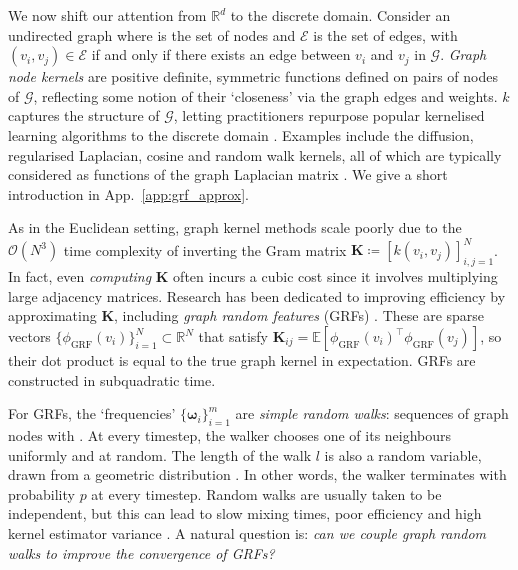 We now shift our attention from $\mathbb{R}^d$ to the discrete domain.
Consider an undirected graph  where  is the set of nodes and $\mathcal{E}$ is the set of edges, with $(v_i,v_j)\in \mathcal{E}$ if and only if there exists an edge between $v_i$ and $v_j$ in $\mathcal{G}$. 
\emph{Graph node kernels}  are positive definite, symmetric functions defined on pairs of nodes of $\mathcal{G}$, reflecting some notion of their `closeness' via the graph edges and weights. 
$k$ captures the structure of $\mathcal{G}$, letting practitioners repurpose popular kernelised learning algorithms to the discrete domain \citep{smola2003kernels,smola-kondor}. 
Examples include the diffusion, regularised Laplacian, cosine and random walk kernels, all of which are typically considered as functions of the graph Laplacian matrix \citep{kondor2002diffusion}.
We give a short introduction in App.~\ref{app:grf_approx}.



As in the Euclidean setting, graph kernel methods scale poorly due to the $\mathcal{O}(N^3)$ time complexity of inverting the Gram matrix $\mathbf{K}\coloneqq [k(v_i,v_j)]_{i,j=1}^N$. 
In fact, even \emph{computing} $\mathbf{K}$ often incurs a cubic cost since it involves multiplying large adjacency matrices. 
Research has been dedicated to improving efficiency by approximating $\mathbf{K}$, including \emph{graph random features} (GRFs) \citep{graph_features,reid2023universal}. 
These are sparse vectors $\{\phi_\textrm{GRF}(v_i)\}_{i=1}^N \subset \mathbb{R}^N$ that satisfy $\mathbf{K}_{ij} = \mathbb{E} \left [ \phi_\textrm{GRF}(v_i)^\top \phi_\textrm{GRF}(v_j) \right ]$, so their dot product is equal to the true graph kernel in expectation.
GRFs are constructed in subquadratic time. 

For GRFs, the `frequencies' $\{\boldsymbol{\omega}_i\}_{i=1}^m$ are \emph{simple random walks}: sequences of graph nodes  with . 
At every timestep, the walker chooses one of its neighbours uniformly and at random.
The length of the walk $l$ is also a random variable, drawn from a geometric distribution . In other words, the walker terminates with probability $p$ at every timestep.
Random walks are usually taken to be independent, but this can lead to slow mixing times, poor efficiency and high kernel estimator variance \citep{alon2007non,zhou2015leveraging}. 
A natural question is: \emph{can we couple graph random walks to improve the convergence of GRFs?} 

